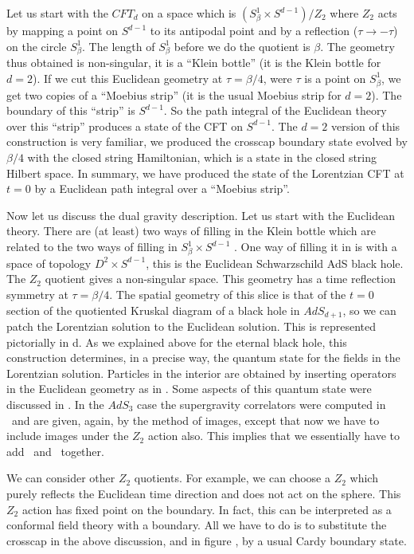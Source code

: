 Let us start with the $CFT_{d}$ 
on a space which is $(S^1_\beta \times S^{d-1})/Z_2 $ where 
$Z_2$ acts by mapping a point on $S^{d-1}$ to its antipodal point
and by  a reflection  ($\tau  \to -\tau$) on   the circle $S^1_\beta$. 
The length of $S^1_\beta $ before we do the quotient 
is $\beta$. The geometry thus obtained
is non-singular, it is a ``Klein bottle'' (it is the Klein bottle
for $d=2$).
If we cut this Euclidean geometry at $ \tau = \beta/4 $, were $\tau$ is
a point on $S^1_\beta$,  we get two copies of a ``Moebius strip'' (it
is the usual Moebius strip for $d=2$). The boundary of this ``strip''
is $S^{d-1}$. So the path integral of the Euclidean theory over this
``strip'' produces a state of the CFT on $S^{d-1}$. The $d=2$ version
of this construction is very familiar,   we  produced  the 
crosscap boundary state evolved by $\beta/4$ with the closed string
Hamiltonian, which is a state in the closed string Hilbert space.
In summary, we have produced the state of the Lorentzian CFT at $t=0$
by a Euclidean path integral over a ``Moebius strip''. 

Now let us discuss  the dual  gravity description.
Let us start with the Euclidean theory. There are (at least) two
ways of filling in the Klein bottle which are related to the two
ways of filling in  $S^1_\beta \times S^{d-1}$ \wittenthermal .
 One way of 
filling it in is with a space of  topology $D^2 \times S^{d-1}$, this
is the Euclidean Schwarzschild AdS 
black hole. The $Z_2$ quotient gives 
 a non-singular space. This geometry has a  time
reflection symmetry at $\tau = \beta/4$. The spatial geometry of this
slice is that of the $t=0$ section of the quotiented Kruskal 
diagram of a black hole in $AdS_{d+1}$, so we can patch the 
Lorentzian solution to the Euclidean solution. 
This is represented pictorially
in  \geon d. As we explained above for
the eternal black hole, this 
construction determines, in a precise way, 
the quantum state for the fields in the 
Lorentzian solution. Particles in the interior are obtained by 
inserting operators in the Euclidean geometry as in \particles . 
Some aspects of this quantum state were discussed
in \geonads .
In the $AdS_3$ case 
the supergravity correlators
were computed in 
\geonads\ and are given, again, by the method of images, except that
now we have to include images under the $Z_2$ action also. This implies
that we  essentially have to  
add \same\ and \other\  together. 


We can  consider other $Z_2$ quotients. For example, we 
can choose 
a $Z_2$ which purely reflects the Euclidean time
direction and does not act on the sphere. This $Z_2$ action has
fixed point on the boundary.
In fact, this   can be interpreted as a 
conformal field theory with a boundary. All we have to do is to 
substitute the crosscap in the above discussion, and in figure \geon ,
by a usual Cardy boundary state. 

